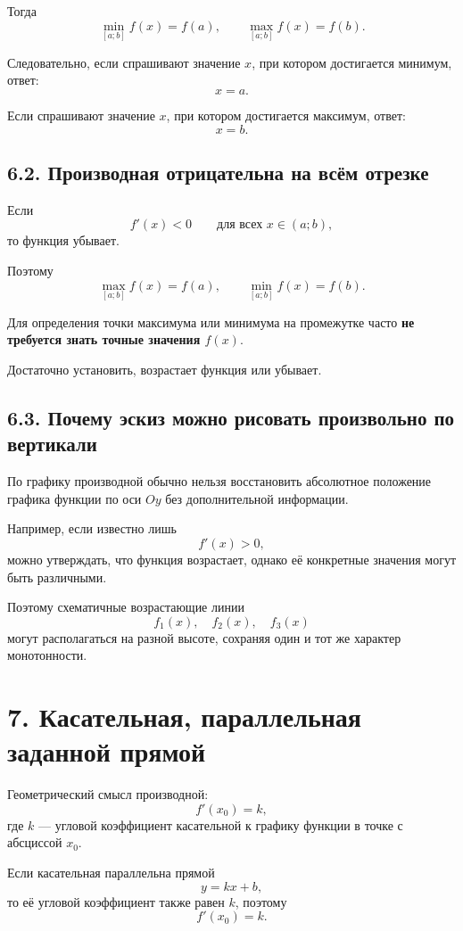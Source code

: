 \documentclass[a4paper,12pt]{article}
\begin{document}
Тогда
\[
\min_{[a;b]}f(x)=f(a),
\qquad
\max_{[a;b]}f(x)=f(b).
\]

Следовательно, если спрашивают значение \(x\), при котором достигается минимум,
ответ:
\[
x=a.
\]

Если спрашивают значение \(x\), при котором достигается максимум,
ответ:
\[
x=b.
\]

\subsection*{6.2. Производная отрицательна на всём отрезке}

Если
\[
f'(x)<0
\qquad
\text{для всех }x\in(a;b),
\]
то функция убывает.

Поэтому
\[
\max_{[a;b]}f(x)=f(a),
\qquad
\min_{[a;b]}f(x)=f(b).
\]

\begin{noticebox}
Для определения точки максимума или минимума на промежутке часто
\textbf{не требуется знать точные значения \(f(x)\)}.

Достаточно установить, возрастает функция или убывает.
\end{noticebox}

\subsection*{6.3. Почему эскиз можно рисовать произвольно по вертикали}

По графику производной обычно нельзя восстановить абсолютное положение графика функции по оси \(Oy\) без дополнительной информации.

Например, если известно лишь
\[
f'(x)>0,
\]
можно утверждать, что функция возрастает, однако её конкретные значения могут быть различными.

Поэтому схематичные возрастающие линии
\[
f_1(x),\quad f_2(x),\quad f_3(x)
\]
могут располагаться на разной высоте, сохраняя один и тот же характер монотонности.

\section*{7. Касательная, параллельная заданной прямой}

Геометрический смысл производной:
\[
f'(x_0)=k,
\]
где \(k\) --- угловой коэффициент касательной к графику функции в точке с абсциссой \(x_0\).

Если касательная параллельна прямой
\[
y=kx+b,
\]
то её угловой коэффициент также равен \(k\), поэтому
\[
f'(x_0)=k.
\]
\end{document}
